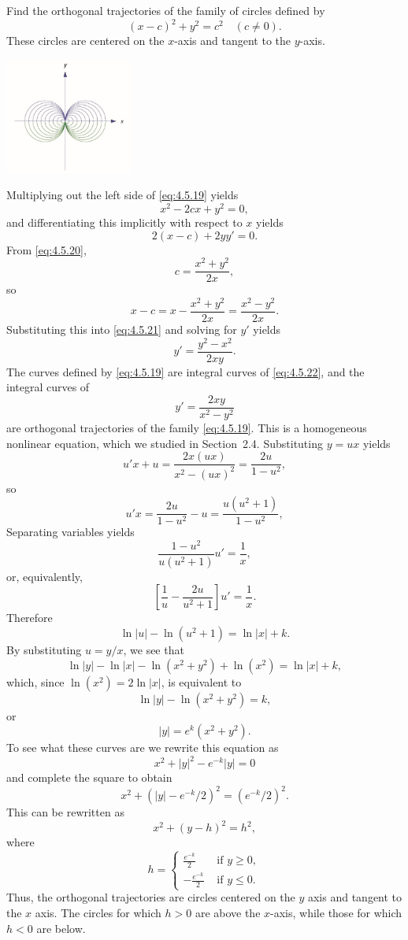 \documentclass{ximera}
\begin{document}
\begin{example}\label{example:4.5.11}
Find the orthogonal trajectories of the family of circles defined by
\begin{equation} \label{eq:4.5.19}
(x-c)^2+y^2=c^2 \quad (c\neq 0).
\end{equation}
 These circles are centered on the $x$-axis and tangent to the
$y$-axis.

\begin{image}
  \includegraphics[height=1.5in]{fig040513a.jpg} 
\end{image}

\begin{explanation}
Multiplying out the left side of \eqref{eq:4.5.19} yields
\begin{equation} \label{eq:4.5.20}
x^2-2cx+y^2=0,
\end{equation}
and differentiating this implicitly with respect to $x$ yields
\begin{equation} \label{eq:4.5.21}
2(x-c)+2yy'=0.
\end{equation}
 From \eqref{eq:4.5.20},
$$
c=\frac{x^2+y^2}{2x},
$$
so
$$
x-c=x-\frac{x^2+y^2}{2x}=\frac{x^2-y^2}{2x}.
$$
Substituting this into \eqref{eq:4.5.21} and solving for $y'$ yields
\begin{equation} \label{eq:4.5.22}
y'=\frac{y^2-x^2}{2xy}.
\end{equation}
The curves defined by \eqref{eq:4.5.19} are integral curves of
\eqref{eq:4.5.22}, and the integral curves of
$$
y'=\frac{2xy}{x^2-y^2}
$$
are orthogonal trajectories of the family \eqref{eq:4.5.19}. This is a
homogeneous nonlinear equation, which we studied in
Section~2.4. Substituting $y=ux$ yields
$$
u'x+u=\frac{2x(ux)}{x^2-(ux)^2}=\frac{2u}{1-u^2},
$$
so
$$
u'x=\frac{2u}{1-u^2}-u=\frac{u(u^2+1)}{1-u^2},
$$
Separating variables yields
$$
\frac{1-u^2}{u(u^2+1)}u'=\frac{1}{x},
$$
or, equivalently,
$$
\left[\frac{1}{u}-\frac{2u}{u^2+1}\right]u'=\frac{1}{x}.
$$
Therefore
$$
\ln |u|-\ln (u^2+1)=\ln |x|+k.
$$
By substituting $u=y/x$, we see that
$$
\ln|y|-\ln|x|-\ln(x^2+y^2)+\ln(x^2)=\ln|x|+k,
$$
which, since $\ln(x^2)=2\ln|x|$, is equivalent to
$$
\ln|y|-\ln(x^2+y^2)=k,
$$
or
$$
|y|=e^k(x^2+y^2).
$$
To see what these curves are we rewrite this equation as
$$
x^2+|y|^2-e^{-k}|y|=0
$$
and complete the square to obtain
$$
x^2+(|y|-e^{-k}/2)^2=(e^{-k}/2)^2.
$$
This can be rewritten as
$$
x^2+(y-h)^2=h^2,
$$
where
$$
h=\left\{\begin{array}{rl} \frac{e^{-k}}{2}&\mbox{ if } y\geq
0,\\-\frac{e^{-k}}{2}&\mbox{ if } y\leq 0. \end{array}\right.
$$
Thus, the orthogonal trajectories are circles centered on the $y$ axis
and tangent to the $x$ axis. The circles
for which $h>0$ are above the $x$-axis, while those for which $h<0$
are below.


\end{explanation}
\end{example}
\end{document}
